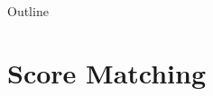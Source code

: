 \documentclass{beamer}
\begin{document}

\begin{frame}
	\titlepage
	\resetonslide	
\end{frame}







\begin{frame}{Outline}
	\tableofcontents
\end{frame}
\section{Score Matching}
\end{document}
